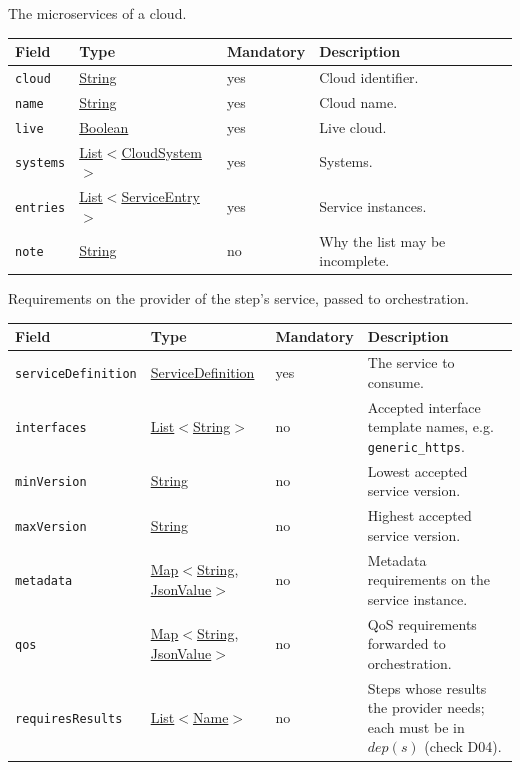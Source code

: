 \documentclass[a4paper]{arrowhead}
\newcommand{\mref}[1]{{\textcolor{ArrowheadPurple}{\hyperref[sec:model:#1]{#1}}}}
\newcommand{\pref}[1]{{\textcolor{ArrowheadGrey}{\hyperref[sec:model:primitives:#1]{#1}}}}
\begin{document}
The microservices of a cloud.

{\small
\begin{longtable}{|p{3.7cm}|p{4.2cm}|p{1.6cm}|p{6.3cm}|}

\hline
\rowcolor{gray!33} Field & Type & Mandatory & Description \\ \hline
\endhead
\texttt{cloud} & \pref{String} & yes & Cloud identifier. \\ \hline
\texttt{name} & \pref{String} & yes & Cloud name. \\ \hline
\texttt{live} & \pref{Boolean} & yes & Live cloud. \\ \hline
\texttt{systems} & \pref{List}$<$\mref{CloudSystem}$>$ & yes & Systems. \\ \hline
\texttt{entries} & \pref{List}$<$\mref{ServiceEntry}$>$ & yes & Service instances. \\ \hline
\texttt{note} & \pref{String} & no & Why the list may be incomplete. \\ \hline
\end{longtable}
}

Requirements on the provider of the step's service, passed to orchestration.

{\small
\begin{longtable}{|p{3.7cm}|p{4.2cm}|p{1.6cm}|p{6.3cm}|}

\hline
\rowcolor{gray!33} Field & Type & Mandatory & Description \\ \hline
\endhead
\texttt{service\allowbreak{}Definition} & \pref{ServiceDefinition} & yes & The service to consume. \\ \hline
\texttt{interfaces} & \pref{List}$<$\pref{String}$>$ & no & Accepted interface template names, e.g. \texttt{generic\_\allowbreak{}https}. \\ \hline
\texttt{minVersion} & \pref{String} & no & Lowest accepted service version. \\ \hline
\texttt{maxVersion} & \pref{String} & no & Highest accepted service version. \\ \hline
\texttt{metadata} & \pref{Map}$<$\pref{String}, \pref{JsonValue}$>$ & no & Metadata requirements on the service instance. \\ \hline
\texttt{qos} & \pref{Map}$<$\pref{String}, \pref{JsonValue}$>$ & no & QoS requirements forwarded to orchestration. \\ \hline
\texttt{requires\allowbreak{}Results} & \pref{List}$<$\pref{Name}$>$ & no & Steps whose results the provider needs; each must be in $dep(s)$ (check D04). \\ \hline
\end{longtable}
}
\end{document}
